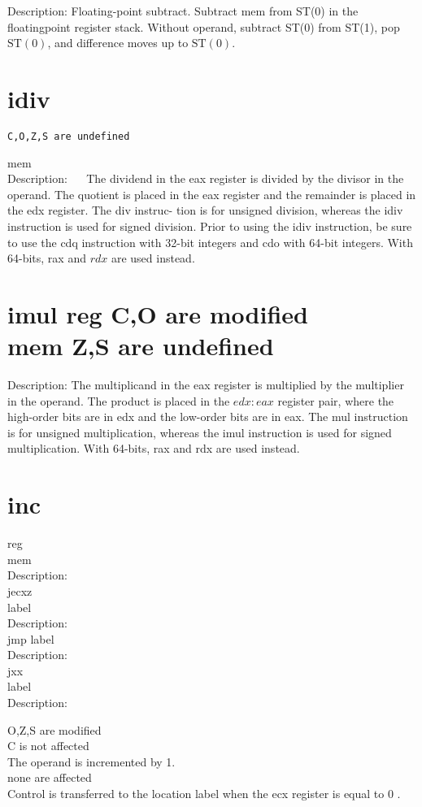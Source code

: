 \documentclass[10pt]{article}
\begin{document}
Description: Floating-point subtract. Subtract mem from ST(0) in the floatingpoint register stack. Without operand, subtract ST(0) from ST(1), pop $\mathrm{ST}(0)$, and difference moves up to $\mathrm{ST}(0)$.

\section*{idiv}
\begin{verbatim}
C,O,Z,S are undefined
\end{verbatim}

mem\\
Description: $\quad$ The dividend in the eax register is divided by the divisor in the operand. The quotient is placed in the eax register and the remainder is placed in the edx register. The div instruc- tion is for unsigned division, whereas the idiv instruction is used for signed division. Prior to using the idiv instruction, be sure to use the cdq instruction with 32-bit integers and cdo with 64-bit integers. With 64-bits, rax and $r d x$ are used instead.

\section*{imul reg C,O are modified \\
 mem Z,S are undefined}
Description: The multiplicand in the eax register is multiplied by the multiplier in the operand. The product is placed in the $e d x: e a x$ register pair, where the high-order bits are in edx and the low-order bits are in eax. The mul instruction is for unsigned multiplication, whereas the imul instruction is used for signed multiplication. With 64-bits, rax and rdx are used instead.

\section*{inc}
reg\\
mem\\
Description:\\
jecxz\\
label\\
Description:\\
jmp label\\
Description:\\
jxx\\
label\\
Description:

O,Z,S are modified\\
C is not affected\\
The operand is incremented by 1.\\
none are affected\\
Control is transferred to the location label when the ecx register is equal to 0 .
\end{document}
